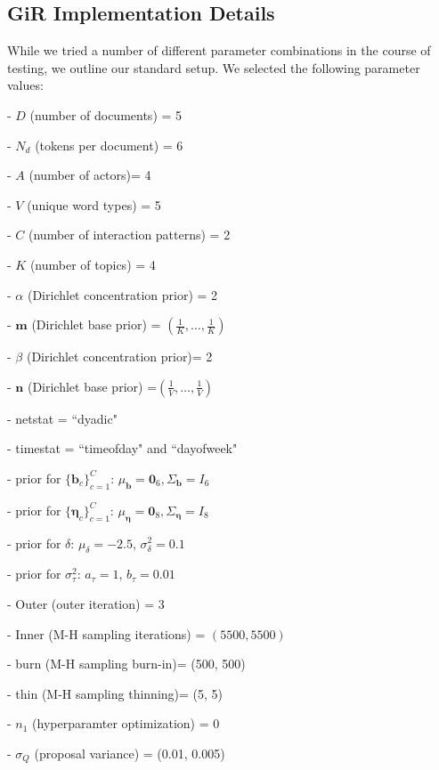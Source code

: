 \documentclass[a4paper]{article}
\begin{document}
  \subsection{GiR Implementation Details} \label{subsec: GiR implementation}
  While we tried a number of different parameter combinations in the course of testing, we outline our standard setup. We selected the following parameter values:
  \begin{itemize}
  	\begin{minipage}{0.49\textwidth}
  		\item[-] $D$ (number of documents) = 5
  		\item[-] $N_d$ (tokens per document) = 6
  		\item[-] $A$ (number of actors)= 4
  		\item[-] $V$ (unique word types) = 5
  		\item[-] $C$ (number of interaction patterns) = 2
  		\item[-] $K$ (number of topics) = 4
  		\item[-] $\alpha$ (Dirichlet concentration prior) = 2
  		\item[-] $\boldsymbol{m}$ (Dirichlet base prior) = $(\frac{1}{K},\ldots, \frac{1}{K})$ 
  		\item[-] $\beta$ (Dirichlet concentration prior)= 2
  		\item[-] $\boldsymbol{n}$ (Dirichlet base prior) =$(\frac{1}{V},\ldots, \frac{1}{V})$ 
  		\item[-] netstat = ``dyadic"
	   \item[-] timestat = ``timeofday" and ``dayofweek" 
  	\end{minipage}
  	\begin{minipage}{0.49\textwidth}
  		\item[-] prior for $\{\boldsymbol{b}_c\}_{c=1}^C$: $\mu_{\boldsymbol{b}} = \boldsymbol{0}_6, \Sigma_{\boldsymbol{b}} =  I_6$
  			\item[-] prior for $\{\boldsymbol{\eta}_c\}_{c=1}^C$: $\mu_{\boldsymbol{\eta}} = \boldsymbol{0}_8, \Sigma_{\boldsymbol{\eta}} =  I_8$
  		\item[-] prior for $\delta$: $\mu_\delta = -2.5$, $\sigma^2_\delta =0.1$
  		\item[-] prior for $\sigma^2_\tau$: $a_\tau = 1$, $b_\tau = 0.01$
  		\item[-] Outer (outer iteration) = 3
  		\item[-] Inner (M-H sampling iterations) = $(5500, 5500)$
  		\item[-] burn (M-H sampling burn-in)= (500, 500)
  		\item[-] thin (M-H sampling thinning)= (5, 5)
  		 \item[-] $n_1$ (hyperparamter optimization) = 0
  		\item[-] $\sigma_Q$ (proposal variance) = (0.01, 0.005)
  	\end{minipage}
  \end{itemize}        
\end{document}
